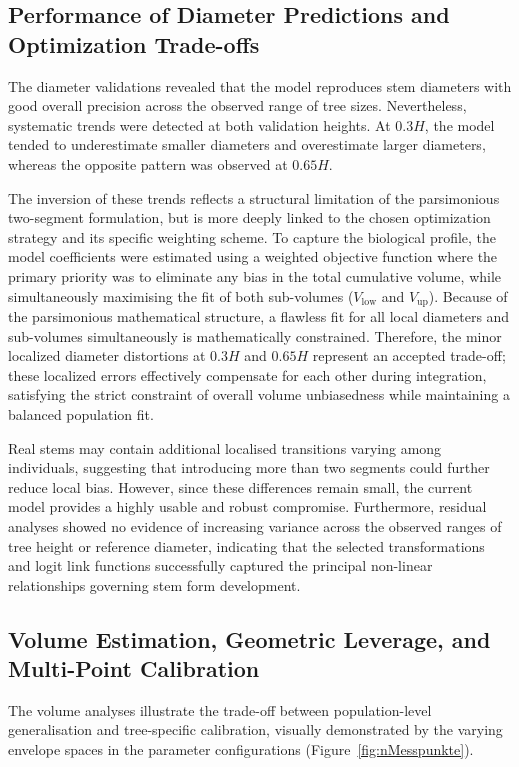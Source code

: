 \documentclass[twocolumn, bibliography=totoc]{scrartcl}
\begin{document}
\subsection{Performance of Diameter Predictions and Optimization Trade-offs}

The diameter validations revealed that the model reproduces stem diameters with good overall precision across the observed range of tree sizes. Nevertheless, systematic trends were detected at both validation heights. At $0.3H$, the model tended to underestimate smaller diameters and overestimate larger diameters, whereas the opposite pattern was observed at $0.65H$. 

The inversion of these trends reflects a structural limitation of the parsimonious two-segment formulation, but is more deeply linked to the chosen optimization strategy and its specific weighting scheme. To capture the biological profile, the model coefficients were estimated using a weighted objective function where the primary priority was to eliminate any bias in the total cumulative volume, while simultaneously maximising the fit of both sub-volumes ($V_{\text{low}}$ and $V_{\text{up}}$). Because of the parsimonious mathematical structure, a flawless fit for all local diameters and sub-volumes simultaneously is mathematically constrained. Therefore, the minor localized diameter distortions at $0.3H$ and $0.65H$ represent an accepted trade-off; these localized errors effectively compensate for each other during integration, satisfying the strict constraint of overall volume unbiasedness while maintaining a balanced population fit. 

Real stems may contain additional localised transitions varying among individuals, suggesting that introducing more than two segments could further reduce local bias. However, since these differences remain small, the current model provides a highly usable and robust compromise. Furthermore, residual analyses showed no evidence of increasing variance across the observed ranges of tree height or reference diameter, indicating that the selected transformations and logit link functions successfully captured the principal non-linear relationships governing stem form development.

\subsection{Volume Estimation, Geometric Leverage, and Multi-Point Calibration}

The volume analyses illustrate the trade-off between population-level generalisation and tree-specific calibration, visually demonstrated by the varying envelope spaces in the parameter configurations (Figure~\ref{fig:nMesspunkte}). 
\end{document}
